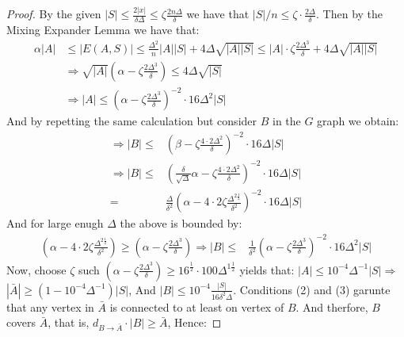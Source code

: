  \begin{proof}
   By the given $|S| \le \frac{2|x|}{\delta\Delta} \le \zeta\frac{2n\Delta}{\delta}$ we have that $|S|/n \le \zeta\cdot \frac{2\Delta}{\delta}$.
   Then by the Mixing Expander Lemma we have that:   
   \begin{equation*}
     \begin{split}
       \alpha |A| & \le |E(A,S)| \le \frac{\Delta^{2}}{n}|A||S| + 4 \Delta \sqrt{|A||S|} \le |A| \cdot \zeta \frac{2\Delta^{3}}{\delta} +  4 \Delta \sqrt{|A||S|}\\ 
       & \Rightarrow \sqrt{|A|}\left(\alpha-\zeta \frac{2\Delta^{3}}{\delta}  \right) \le 4\Delta\sqrt{|S|} \\
       & \Rightarrow |A| \le \left( \alpha -  \zeta \frac{2\Delta^{3}}{\delta}  \right)^{-2} \cdot 16\Delta^{2}|S|
     \end{split}
   \end{equation*}
   And by repetting the same calculation but consider $B$ in the $G$ graph we obtain: 
\begin{equation*}
     \begin{split}
       \Rightarrow  |B| \le & \left( \beta -  \zeta \frac{4 \cdot 2\Delta^{2} }{\delta}  \right)^{-2} \cdot 16\Delta|S|\\
       \Rightarrow  |B| \le & \left( \frac{\delta}{\sqrt{\Delta}}\alpha   -  \zeta \frac{4 \cdot 2\Delta^{2} }{\delta}  \right)^{-2} \cdot 16\Delta|S|\\
       = & \frac{\Delta}{\delta^{2}} \left(  \alpha -  4\cdot 2\zeta \frac{\Delta^{2\frac{1}{2}}}{\delta^{2}}   \right)^{-2} \cdot 16\Delta|S| 
     \end{split}
   \end{equation*}
   And for large enugh $\Delta$ the above is bounded by:
   \begin{equation*}
     \begin{split}
     \left(  \alpha -  4\cdot 2\zeta \frac{\Delta^{2\frac{1}{2}}}{\delta^{2}}   \right) \ge \left( \alpha -  \zeta \frac{2\Delta^{3}}{\delta}  \right) \Rightarrow |B|  \le  & \frac{1}{\delta^{2}} \left( \alpha -  \zeta \frac{2\Delta^{3}}{\delta}  \right)^{-2} \cdot 16\Delta^{2}|S| 
     \end{split}
   \end{equation*}
   Now, choose $\zeta$ such $\left( \alpha -  \zeta \frac{2\Delta^{3}}{\delta}  \right) \ge 16^{\frac{1}{2}} \cdot 100 \Delta^{1\frac{1}{2}}$ yields that: $|A| \le 10^{-4}\Delta^{-1} |S| \Rightarrow $$ |\bar{A}| \ge \left( 1 - 10^{-4} \Delta^{-1}\right)|S|$, And $|B| \le 10^{-4} \frac{|S|}{16 \delta^{2}\Delta}$. Conditions (2) and (3) garunte that any vertex in $\bar{A}$ is connected to at least on vertex of $B$. And therfore, $B$ covers $\bar{A}$, that is, $ d_{B\rightarrow\bar{A}}\cdot |B| \ge \bar{A}$, Hence:


\end{proof}
